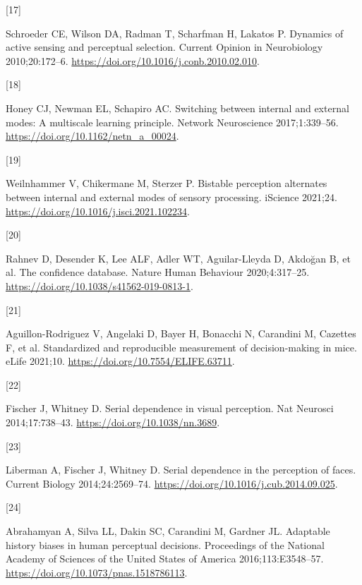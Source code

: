 \documentclass[
]{article}
\newlength{\cslhangindent}
\newlength{\csllabelwidth}
\newlength{\cslentryspacingunit} %
\newenvironment{CSLReferences}[2] %
 {%
  \setlength{\parindent}{0pt}
  \ifodd #1
  \let\oldpar\par
  \def\par{\hangindent=\cslhangindent\oldpar}
  \fi
  \setlength{\parskip}{#2\cslentryspacingunit}
 }%
 {}
\newcommand{\CSLLeftMargin}[1]{\parbox[t]{\csllabelwidth}{#1}}
\newcommand{\CSLRightInline}[1]{\parbox[t]{\linewidth - \csllabelwidth}{#1}\break}
\begin{document}
\begin{CSLReferences}{0}{0}
\leavevmode{}%
\CSLLeftMargin{{[}17{]} }%
\CSLRightInline{Schroeder CE, Wilson DA, Radman T, Scharfman H, Lakatos
P. Dynamics of active sensing and perceptual selection. Current Opinion
in Neurobiology 2010;20:172--6.
\url{https://doi.org/10.1016/j.conb.2010.02.010}.}

\leavevmode{}%
\CSLLeftMargin{{[}18{]} }%
\CSLRightInline{Honey CJ, Newman EL, Schapiro AC. Switching between
internal and external modes: A multiscale learning principle. Network
Neuroscience 2017;1:339--56.
\url{https://doi.org/10.1162/netn_a_00024}.}

\leavevmode{}%
\CSLLeftMargin{{[}19{]} }%
\CSLRightInline{Weilnhammer V, Chikermane M, Sterzer P. Bistable
perception alternates between internal and external modes of sensory
processing. iScience 2021;24.
\url{https://doi.org/10.1016/j.isci.2021.102234}.}

\leavevmode{}%
\CSLLeftMargin{{[}20{]} }%
\CSLRightInline{Rahnev D, Desender K, Lee ALF, Adler WT, Aguilar-Lleyda
D, Akdoğan B, et al. The confidence database. Nature Human Behaviour
2020;4:317--25. \url{https://doi.org/10.1038/s41562-019-0813-1}.}

\leavevmode{}%
\CSLLeftMargin{{[}21{]} }%
\CSLRightInline{Aguillon-Rodriguez V, Angelaki D, Bayer H, Bonacchi N,
Carandini M, Cazettes F, et al. Standardized and reproducible
measurement of decision-making in mice. eLife 2021;10.
\url{https://doi.org/10.7554/ELIFE.63711}.}

\leavevmode{}%
\CSLLeftMargin{{[}22{]} }%
\CSLRightInline{Fischer J, Whitney D. Serial dependence in visual
perception. Nat Neurosci 2014;17:738--43.
\url{https://doi.org/10.1038/nn.3689}.}

\leavevmode{}%
\CSLLeftMargin{{[}23{]} }%
\CSLRightInline{Liberman A, Fischer J, Whitney D. Serial dependence in
the perception of faces. Current Biology 2014;24:2569--74.
\url{https://doi.org/10.1016/j.cub.2014.09.025}.}

\leavevmode{}%
\CSLLeftMargin{{[}24{]} }%
\CSLRightInline{Abrahamyan A, Silva LL, Dakin SC, Carandini M, Gardner
JL. Adaptable history biases in human perceptual decisions. Proceedings
of the National Academy of Sciences of the United States of America
2016;113:E3548--57. \url{https://doi.org/10.1073/pnas.1518786113}.}


\end{CSLReferences}
\end{document}
